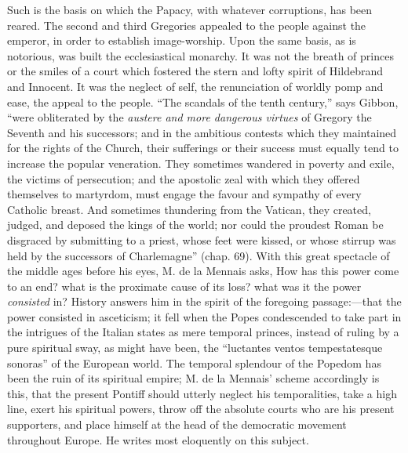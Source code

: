Such is the basis on which the Papacy, with
whatever corruptions, has been reared. The second and third Gregories
appealed to the people against the emperor, in order to establish
image-worship. Upon the same basis, as is notorious, was built the
ecclesiastical monarchy. It was not the breath of princes or the
smiles of a court which fostered the stern and lofty spirit of
Hildebrand and Innocent. It was the neglect of self, the renunciation
of worldly pomp and ease, the appeal to the people. ``The scandals of
the tenth century,'' says Gibbon, ``were obliterated by the \emph{austere and
more dangerous virtues} of Gregory the Seventh and his successors; and
in the ambitious contests which they maintained for the rights of the
Church, their sufferings or their success must equally tend to
increase the popular veneration. They sometimes wandered in poverty
and exile, the victims of persecution; and the apostolic zeal with
which they offered themselves to martyrdom, must engage the favour and
sympathy of every Catholic breast. And sometimes thundering from the
Vatican, they created, judged, and deposed the kings of the world; nor
could the proudest Roman be disgraced by submitting to a priest, whose
feet were kissed, or whose stirrup was held by the successors of
Charlemagne'' (chap. 69). With this great spectacle of the middle ages
before his eyes, M. de la Mennais asks, How has this power come to an
end? what is the proximate cause of its loss? what was it the power \emph{consisted}
in? History answers him in the spirit of the foregoing passage:—that the power consisted in asceticism; it fell when the
Popes condescended to take part in the intrigues of the Italian states
as mere temporal princes, instead of ruling by a pure spiritual sway,
as might have been, the ``luctantes ventos tempestatesque sonoras'' of
the European world. The temporal splendour of the Popedom has been the
ruin of its spiritual empire; M. de la Mennais' scheme accordingly is
this, that the present Pontiff should utterly neglect his
temporalities, take a high line, exert his spiritual powers, throw off
the absolute courts who are his present supporters, and place himself
at the head of the democratic movement throughout Europe. He writes
most eloquently on this subject.

